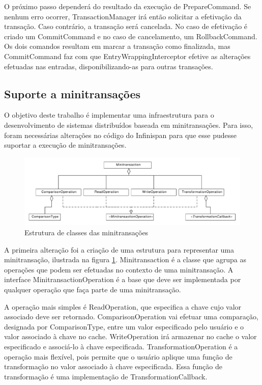 \documentclass[11pt,twoside,a4paper]{book}
\begin{document}
O próximo passo dependerá do resultado da execução de PrepareCommand. Se nenhum erro ocorrer, TransactionManager irá então solicitar a efetivação da transação. Caso contrário, a transação será cancelada. No caso de efetivação é criado um CommitCommand e no caso de cancelamento, um RollbackCommand. Os dois comandos resultam em marcar a transação como finalizada, mas CommitCommand faz com que EntryWrappingInterceptor efetive as alterações efetuadas nas entradas, disponibilizando-as para outras transações.

\subsection{Suporte a minitransações}
\label{sec:suporte_mt_infinispan}

O objetivo deste trabalho é implementar uma infraestrutura para o desenvolvimento de sistemas distribuídos baseada em minitransações. Para isso, foram necessárias alterações no código do Infinispan para que esse pudesse suportar a execução de minitransações.

\begin{figure}
  \centering
  \includegraphics[width=\textwidth]{transaction_operations} 
  \caption{Estrutura de classes das minitransações}
  \label{fig:transaction_operations} 
\end{figure}

A primeira alteração foi a criação de uma estrutura para representar uma minitransação, ilustrada na figura \ref{fig:transaction_operations}. Minitransaction é a classe que agrupa as operações que podem ser efetuadas no contexto de uma minitransação. A interface MinitransactionOperation é a base que deve ser implementada por qualquer operação que faça parte de uma minitransação.

A operação mais simples é ReadOperation, que especifica a chave cujo valor associado deve ser retornado. ComparisonOperation vai efetuar uma comparação, designada por ComparisonType, entre um valor especificado pelo usuário e o valor associado à chave no cache. WriteOperation irá armazenar no cache o valor especificado e associá-lo à chave especificada. TransformationOperation é a operação mais flexível, pois permite que o usuário aplique uma função de transformação no valor associado à chave especificada. Essa função de transformação é uma implementação de TransformationCallback.
\end{document}
